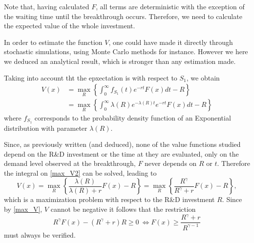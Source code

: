Note that, having calculated $F$, all terms are deterministic with the exception of the waiting time until the breakthrough occurs. Therefore, we need to calculate the expected value of the whole investment.

In order to estimate the function $V$, one could have made it directly through stochastic simulations, using Monte Carlo methods for instance. However we here we deduced an analytical result, which is stronger than any estimation made.


Taking into account tht the epxectation is with respect to $S_1$, we obtain
\begin{align}
 V(x)&=\max_R  \left\{ \int_0 ^\infty f_{S_1}(t) e^{-rt} F(x) dt -R \right\} \nonumber \\
 &=\max_R  \left\{ \int_0 ^\infty \lambda(R) e^{-\lambda(R)t} e^{-rt} F(x) dt -R \right\} \label{max_V2}
\end{align}
where $f_{S_1}$ corresponds to the probability density function of an Exponential distribution with parameter $\lambda(R)$. %

Since, as previously written (and deduced), none of the value functions studied depend on the R\&D investment or the time at they are evaluated, only on the demand level observed at the breakthrough, $F$ never depends on $R$ or $t$. Therefore the integral on \eqref{max_V2} can be solved, leading to
\begin{equation}
V(x)=\max_R \left\{ \frac{\lambda(R)}{\lambda(R)+r} F(x) -R \right\}=\max_R \left\{ \frac{R^\gamma}{R^\gamma+r} F(x) -R \right\},
\label{max_V3}
\end{equation}
which is a maximization problem with respect to the R\&D investment $R$. Since by \eqref{max_V}, $V$ cannot be negative it follows that the restriction
\begin{equation}
R^\gamma F(x) - (R^\gamma+r)R \geq 0 \ \Leftrightarrow  F(x) \geq \frac{R^\gamma+r}{R^{\gamma-1}}
	\label{max_rest}
\end{equation}
must always be verified.

